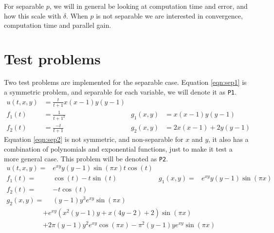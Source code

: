 For separable $p$, we will in general be looking at computation time and error, and how this scale with $\delta$. When $p$ is not separable we are interested in convergence, computation time and parallel gain. \\



\section{Test problems} \label{sec:test}
Two test problems are implemented for the separable case. Equation \eqref{eqn:sep1} is a symmetric problem, and separable for each variable, we will denote it as \texttt{P1}. 
\begin{equation} \label{eqn:sep1}
\begin{aligned}
 u(t,x,y)&= \frac{t}{t+1} x(x-1)y(y-1) \\
 f_1(t)&=\frac{1}{t+1^2} & g_1(x,y)&= x(x-1)y(y-1) \\
 f_2(t) &= \frac{-t}{t+1} & g_2(x,y)& = 2x(x-1) +2y(y-1)
 \end{aligned}
\end{equation}
Equation \eqref{eqn:sep2} is not symmetric, and non-separable for $x$ and $y$, it also has a combination of polynomials and exponential functions, just to make it test a more general case. 
This problem will be denoted as \texttt{P2}.\\
\begin{equation} \label{eqn:sep2}
\begin{aligned}
 u(t,x,y)=& e^{xy}y(y-1) \sin( \pi x)t \cos(t)& \\
 f_1(t) =& \cos(t)-t \sin(t)  & g_1(x,y) =&e^{xy}y(y-1) \sin( \pi x)\\
 f_2(t) =& -t \cos(t) \\ g_2(x,y) =&(y-1)y^3e^{xy} \sin ( \pi x)
 \end{aligned}
\end{equation}
\begin{equation*}
\begin{aligned}
&+e^{xy}(x^2(y-1)y+x(4y-2)+2) \sin( \pi x) \\&+2 \pi (y-1) y^2 e^{xy} \cos( \pi x)- \pi^2 (y-1)y e^{xy} \sin( \pi x )
 \end{aligned}
\end{equation*}

